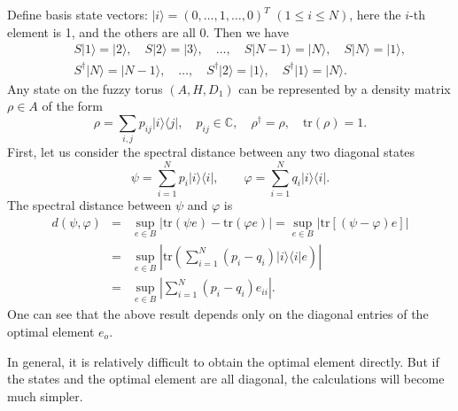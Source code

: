 \documentclass[a4paper,11pt]{article}
\begin{document}
Define basis state vectors: $|i \rangle = (0, \ldots, 1, \ldots, 0)^T$ $(1 \leqslant i
\leqslant N)$, here the $i$-th element is 1, and the others are all 0. Then we have
\begin{eqnarray}
  && S| 1 \rangle = |2 \rangle, \quad S| 2 \rangle = |3 \rangle, \quad \ldots,\quad S |N-1 \rangle = |N \rangle,
  \quad S|N \rangle = |1 \rangle,
\nonumber\\
  && S^{\dag} |N \rangle = |N - 1 \rangle, \quad \ldots, \quad S^{\dag} |2
  \rangle = |1 \rangle, \quad S^{\dag} |1 \rangle = |N \rangle .
\end{eqnarray}
Any state on the fuzzy torus $(A, H, D_1)$ can be represented by a density
matrix $\rho \in A$ of the form
\begin{equation}
  \rho = \sum_{i, j} p_{ij} |i \rangle \langle j|,\quad p_{ij}\in\mathbb{C}, \quad \rho^{\dag} = \rho,
  \quad \mathrm{tr} (\rho) = 1.
\end{equation}
First, let us consider the spectral distance between any two diagonal states
\begin{equation}
  \psi = \sum_{i = 1}^N p_i |i \rangle \langle i|, \qquad \varphi = \sum_{i =
  1}^N q_i |i \rangle \langle i| .
\end{equation}
The spectral distance between $\psi$ and $\varphi$ is
\begin{eqnarray}\label{pqe}
  d (\psi, \varphi) & = & \sup_{e \in B} | \mathrm{tr} (\psi e) - \mathrm{tr}
  (\varphi e) | = \sup_{e \in B} | \mathrm{tr} [(\psi - \varphi) e] |
  \nonumber\\
  & = & \sup_{e \in B} \left| \mathrm{tr} \left( \sum_{i = 1}^N  (p_i - q_i)
  |i \rangle \langle i|e  \right) \right| \nonumber\\
  & = & \sup_{e \in B} \left| \sum_{i = 1}^N (p_i - q_i) e_{ii} \right| . 
\end{eqnarray}
One can see that the above result depends only on the diagonal entries of the
optimal element $e_o$.

In general, it is relatively difficult to obtain the optimal element directly.
But if the states and the optimal element are all diagonal, the calculations
will become much simpler.
\end{document}
